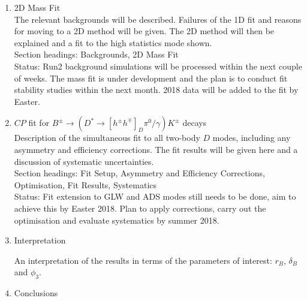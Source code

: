 \documentclass[oneside,12pt]{article}
\begin{document}
\begin{enumerate}
\item 2D Mass Fit \\

The relevant backgrounds will be described. Failures of the 1D fit and reasons
for moving to a 2D method will be given. The 2D method will then be explained
and a fit to the high statistics mode shown. \\

Section headings: Backgrounds, 2D Mass Fit \\

Status: Run2 background simulations will be processed within the next couple of
weeks. The mass fit is under development and the plan is to conduct fit
stability studies within the next month. 2018 data will be added to the fit by
Easter. 

\item $CP$ fit for $B^{\pm}\rightarrow (D^*\rightarrow
[h^{\pm}h^{\mp}]_D\pi^0/\gamma)K^{\pm}$ decays \\

Description of the simultaneous fit to all two-body $D$ modes, including any
asymmetry and efficiency corrections. The fit results will be given here and a
discussion of systematic uncertainties. \\

Section headings: Fit Setup, Asymmetry and Efficiency Corrections,
Optimisation, Fit Results, Systematics \\

Status: Fit extension to GLW and ADS modes still needs to be done, aim to
achieve this by Easter 2018. Plan to apply corrections, carry out the
optimisation and evaluate systematics by summer 2018.

\item Interpretation 

An interpretation of the results in terms of the parameters of interest: $r_B$,
$\delta_B$ and $\phi_3$.

\item Conclusions

\end{enumerate}

\printbibliography[heading=bibintoc,{title=References}]
\end{document}
